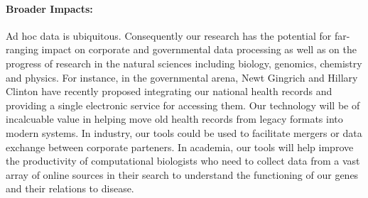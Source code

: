 
\paragraph*{Broader Impacts:}  
Ad hoc data is ubiquitous. Consequently our research has the 
potential for far-ranging impact on corporate and
governmental data processing as well as
on the progress of research in the natural sciences including
biology, genomics, chemistry and physics.  For instance, in the governmental
arena, Newt Gingrich and Hillary Clinton have recently proposed integrating 
our national health records and providing a single electronic service
for accessing them.  Our technology will be of incalcuable value in helping
move old health records from legacy formats into modern systems.
In industry, our tools could be used to facilitate mergers or
data exchange between corporate parteners.
In academia, our tools will help improve the productivity of
computational biologists who need to collect data from a vast
array of online sources in their search to understand the functioning of our
genes and their relations to disease.

